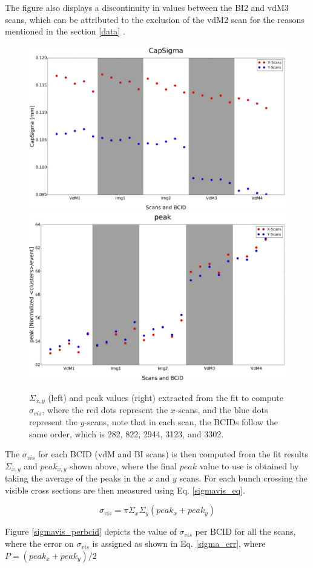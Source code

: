 The figure also displays a discontinuity in values between the BI2 and vdM3 scans, which can be attributed to the exclusion of the vdM2 scan for the reasons mentioned in the section \ref{data} . 

\begin{center}
  \begin{figure}[h!]
    \centering
    \includegraphics[width=.49\textwidth]{Chapter4/DGConst_CapSigma.png}
    \includegraphics[width=.48\textwidth]{Chapter4/DGConst_peak.png}
    \caption[$\Sigma_{x,y}$ and peak values per BCID for all scan pairs]{$\Sigma_{x,y}$ (left) and peak values (right) extracted from the fit to compute $\sigma_{vis}$, where the red dots represent the $x$-scans, and the blue dots represent the $y$-scans, note that in each scan, the BCIDs follow the same order, which is 282, 822, 2944, 3123, and 3302.} 
    \label{capsigma_peak}
  \end{figure}
\end{center}

The $\sigma_{vis}$ for each BCID (vdM and BI scans) is then computed from the fit results $\Sigma_{x,y}$ and $peak_{x,y}$ shown above, where the final $peak$ value to use  is obtained by taking the average of the peaks in the $x$ and $y$ scans. For each bunch crossing the visible cross sections are then measured using Eq. \ref{sigmavis_eq}.

\begin{equation}
 \sigma_{vis}= \pi \Sigma_{x} \Sigma_{y}(peak_{x}+peak_{y})
 \end{equation}

Figure \ref{sigmavis_perbcid} depicts the  value of $\sigma_{vis}$ per BCID for all the scans, where the error on $\sigma_{vis}$ is assigned as shown in Eq. \ref{sigma_err}, where $P=(peak_{x}+peak_{y})/2$


